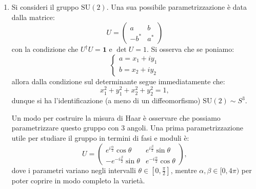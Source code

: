 \begin{example}
\begin{enumerate}[label=\protect\circled{\arabic*}]
        \begin{equation}
            \int_{\text{SO}(2)} dg f(g) = \int_{0}^{2 \pi} \frac{d\theta}{2 \pi} = 1.
        \end{equation}
        \item Si consideri il gruppo $\text{SU}(2)$. Una sua possibile parametrizzazione è data dalla matrice:
            \begin{equation}
                U = \begin{pmatrix}
                    a & b \\
                    -b^{\ast} & a^{\ast}
                \end{pmatrix}
            \end{equation}
            con la condizione che $U^\dagger U = \mathbf{1}$ e $\det{U} = 1$. Si osserva che se poniamo:
            \begin{equation}
                \begin{cases}
                    a = x_1 + i y_1 \\
                    b = x_2 + i y_2
                \end{cases}
            \end{equation}
            allora dalla condizione sul determinante segue immediatamente che:
            \begin{equation}
                x_1^2 + y_1^2 + x_2^2 + y_2^2 = 1,
            \end{equation}
            dunque si ha l'identificazione (a meno di un diffeomorfismo) $\text{SU}(2) \sim S^3$. 

            Un modo per costruire la misura di Haar è osservare che possiamo parametrizzare questo gruppo con $3$ angoli. Una prima parametrizzazione utile per studiare il gruppo in termini di fasi e moduli è:
            \begin{equation}
                U = \begin{pmatrix}
                    e^{i \frac{\alpha}{2}} \cos{\theta} & e^{i \frac{\beta}{2}} \sin{\theta} \\
                    -e^{-i \frac{\beta}{2}} \sin{\theta} & e^{-i \frac{\alpha}{2}} \cos{\theta}
                \end{pmatrix},
            \end{equation}
            dove i parametri variano negli intervalli $\theta \in \left[0, \frac{\pi}{2}\right]$, mentre $\alpha, \beta \in [0, 4\pi)$ per poter coprire in modo completo la varietà.


\end{enumerate}
\end{example}
